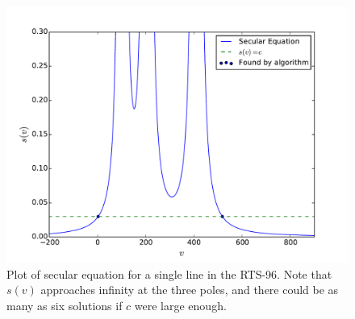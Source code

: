 \documentclass[conference]{IEEEtran}
\begin{document}
\begin{figure}[t]
\centering
\includegraphics[trim=0in 0in 0.5in 0.5in,clip,width=1\linewidth]{images/secular}
\caption{Plot of secular equation for a single line in the RTS-96. Note that $s(v)$ approaches infinity at the three poles, and there could be as many as six solutions if $c$ were large enough.}
\label{fig:secular}
\end{figure}

\end{document}
